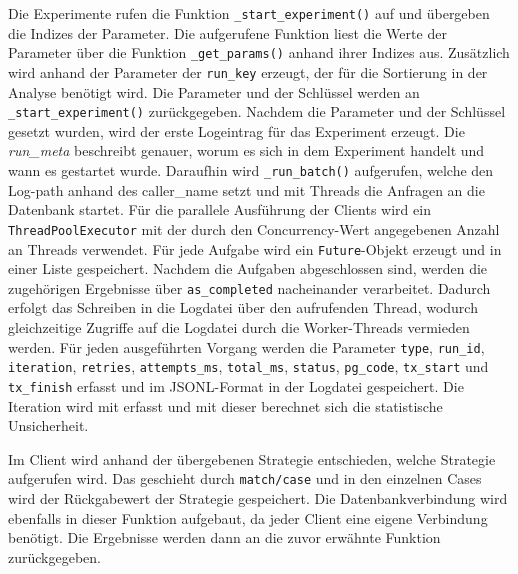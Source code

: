 Die Experimente rufen die Funktion \texttt{\_start\_experiment()} auf und übergeben die Indizes der Parameter.
Die aufgerufene Funktion liest die Werte der Parameter über die Funktion \texttt{\_get\_params()} anhand
ihrer Indizes aus.
Zusätzlich wird anhand der Parameter der \texttt{run\_key} erzeugt, der für die Sortierung in der Analyse benötigt
wird.
Die Parameter und der Schlüssel werden an \texttt{\_start\_experiment()} zurückgegeben.
Nachdem die Parameter und der Schlüssel gesetzt wurden, wird der erste Logeintrag für das Experiment erzeugt.
Die \emph{run\_meta} beschreibt genauer, worum es sich in dem Experiment handelt und wann es gestartet wurde.
Daraufhin wird \texttt{\_run\_batch()} aufgerufen, welche den Log-path anhand des caller\_name setzt und mit Threads
die Anfragen an die Datenbank startet.
Für die parallele Ausführung der Clients wird ein \texttt{ThreadPoolExecutor} mit der durch den Concurrency-Wert
angegebenen Anzahl an Threads verwendet.
Für jede Aufgabe wird ein \texttt{Future}-Objekt erzeugt und in einer Liste gespeichert.
Nachdem die Aufgaben abgeschlossen sind, werden die zugehörigen Ergebnisse über \texttt{as\_completed} nacheinander
verarbeitet.
Dadurch erfolgt das Schreiben in die Logdatei über den aufrufenden Thread, wodurch gleichzeitige Zugriffe auf die
Logdatei durch die Worker-Threads vermieden werden.
Für jeden ausgeführten Vorgang werden die Parameter \texttt{type}, \texttt{run\_id}, \texttt{iteration},
\texttt{retries}, \texttt{attempts\_ms}, \texttt{total\_ms}, \texttt{status}, \texttt{pg\_code}, \texttt{tx\_start}
und \texttt{tx\_finish} erfasst und im JSONL-Format in der Logdatei gespeichert.
Die Iteration wird mit erfasst und mit dieser berechnet sich die statistische Unsicherheit.

Im Client wird anhand der übergebenen Strategie entschieden, welche Strategie aufgerufen wird.
Das geschieht durch \texttt{match/case} und in den einzelnen Cases wird der Rückgabewert der Strategie
gespeichert.
Die Datenbankverbindung wird ebenfalls in dieser Funktion aufgebaut, da jeder Client eine eigene Verbindung benötigt.
Die Ergebnisse werden dann an die zuvor erwähnte Funktion zurückgegeben.